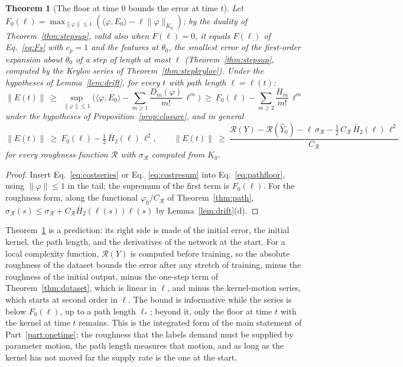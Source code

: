 \documentclass[11pt]{article}
\newtheorem{theorem}{Theorem}
\theoremstyle{definition}
\theoremstyle{remark}
\newcommand{\Rgh}{\mathcal{R}}           %
\newcommand{\sR}{\sigma_{\Rgh}}
\newcommand{\CR}{C_{\Rgh}}
\newcommand{\ip}[2]{\langle #1,#2\rangle}
\begin{document}
\begin{theorem}[The floor at time 0 bounds the error at time $t$]\label{thm:time0}
Let $F_0(\ell) = \max_{\|\varphi\|\le1}(\ip{\varphi}{E_0} - \ell\|\varphi\|_{K_0})$; by the duality of Theorem~\ref{thm:stepsup}, valid also when $F(\ell) = 0$, it equals $F(\ell)$ of Eq.~\eqref{eq:Fs} with $c_p = 1$ and the features at $\theta_0$, the smallest error of the first-order expansion about $\theta_0$ of a step of length at most $\ell$ (Theorem~\ref{thm:stepsup}, computed by the Krylov series of Theorem~\ref{thm:stepkrylov}).
Under the hypotheses of Lemma~\ref{lem:drift}, for every $t$ with path length $\ell = \ell(t)$:
\begin{equation}\label{eq:time0series}
\|E(t)\|\ \ge\ \sup_{\|\varphi\|\le1}\Big(\ip{\varphi}{E_0} - \sum_{m\ge1}\frac{D_m(\varphi)}{m!}\,\ell^m\Big)\ \ge\ F_0(\ell) - \sum_{m\ge2}\frac{H_m}{m!}\,\ell^m
\end{equation}
under the hypotheses of Proposition~\ref{prop:closure}, and in general
\begin{equation}\label{eq:time0}
\|E(t)\|\ \ge\ F_0(\ell) - \tfrac12\,\bar H_2(\ell)\,\ell^2,\qquad
\|E(t)\|\ \ge\ \frac{\Rgh(Y) - \Rgh(\hat Y_0) - \ell\,\sR - \tfrac12\,\CR\,\bar H_2(\ell)\,\ell^2}{\CR}
\end{equation}
for every roughness function $\Rgh$ with $\sR$ computed from $K_0$.
\end{theorem}

\begin{proof}
Insert Eq.~\eqref{eq:costseries} or Eq.~\eqref{eq:costresum} into Eq.~\eqref{eq:pathfloor}, using $\|\varphi\|\le1$ in the tail; the supremum of the first term is $F_0(\ell)$.
For the roughness form, along the functional $\varphi_0/\CR$ of Theorem~\ref{thm:path}, $\sR(s)\le\sR + \CR\bar H_2(\ell(s))\ell(s)$ by Lemma~\ref{lem:drift}(d).
\end{proof}

Theorem~\ref{thm:time0} is a prediction: its right side is made of the initial error, the initial kernel, the path length, and the derivatives of the network at the start.
For a local complexity function, $\Rgh(Y)$ is computed before training, so the absolute roughness of the dataset bounds the error after any stretch of training, minus the roughness of the initial output, minus the one-step term of Theorem~\ref{thm:dataset}, which is linear in $\ell$, and minus the kernel-motion series, which starts at second order in $\ell$.
The bound is informative while the series is below $F_0(\ell)$, up to a path length $\ell_\ast$; beyond it, only the floor at time $t$ with the kernel at time $t$ remains.
This is the integrated form of the main statement of Part~\ref{part:onetime}: the roughness that the labels demand must be supplied by parameter motion, the path length measures that motion, and as long as the kernel has not moved far the supply rate is the one at the start.
\end{document}
